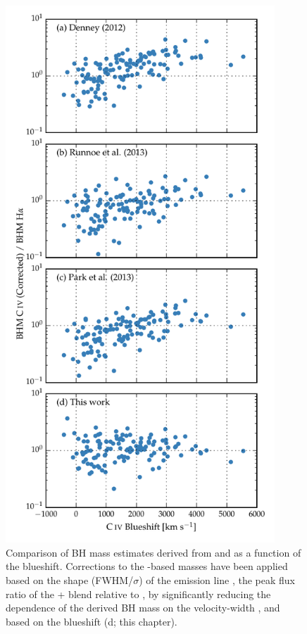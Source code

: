 \begin{figure}
    \includegraphics[width=0.9\textwidth]{figures/chapter03/corrections.pdf}  
    \caption{Comparison of BH mass estimates derived from  and \ha as a function of the  blueshift. Corrections to the -based masses have been applied based on the shape (FWHM/$\sigma$) of the  emission line \citep[a;][]{denney12}, the peak flux ratio of the + blend relative to  \citep[b;][]{runnoe13}, by significantly reducing the dependence of the derived BH mass on the  velocity-width \citep[c;][]{park13}, and based on the  blueshift (d; this chapter).}
    \label{fig:compare_corrections}
\end{figure}

